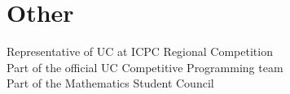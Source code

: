 \documentclass[11pt]{article} %
\begin{document}
\section*{Other}
Representative of UC at ICPC Regional Competition\\
Part of the official UC Competitive Programming team\\
Part of the Mathematics Student Council








%

%
%
%
\end{document}
